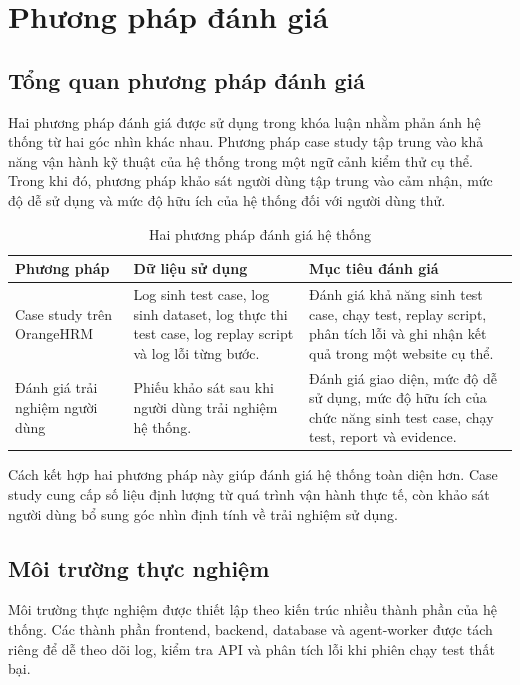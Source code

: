 \section{Phương pháp đánh giá}

\subsection{Tổng quan phương pháp đánh giá}

Hai phương pháp đánh giá được sử dụng trong khóa luận nhằm phản ánh hệ thống từ hai góc nhìn khác nhau. Phương pháp case study tập trung vào khả năng vận hành kỹ thuật của hệ thống trong một ngữ cảnh kiểm thử cụ thể. Trong khi đó, phương pháp khảo sát người dùng tập trung vào cảm nhận, mức độ dễ sử dụng và mức độ hữu ích của hệ thống đối với người dùng thử.

\begin{table}[H]
\centering
\caption{Hai phương pháp đánh giá hệ thống}
\label{tab:chapter6_evaluation_methods}
\renewcommand{\arraystretch}{1.2}
\begin{tabular}{|p{4.0cm}|p{5.2cm}|p{5.2cm}|}
\hline
\textbf{Phương pháp} & \textbf{Dữ liệu sử dụng} & \textbf{Mục tiêu đánh giá} \\
\hline
Case study trên OrangeHRM & Log sinh test case, log sinh dataset, log thực thi test case, log replay script và log lỗi từng bước. & Đánh giá khả năng sinh test case, chạy test, replay script, phân tích lỗi và ghi nhận kết quả trong một website cụ thể. \\
\hline
Đánh giá trải nghiệm người dùng & Phiếu khảo sát sau khi người dùng trải nghiệm hệ thống. & Đánh giá giao diện, mức độ dễ sử dụng, mức độ hữu ích của chức năng sinh test case, chạy test, report và evidence. \\
\hline
\end{tabular}
\end{table}

Cách kết hợp hai phương pháp này giúp đánh giá hệ thống toàn diện hơn. Case study cung cấp số liệu định lượng từ quá trình vận hành thực tế, còn khảo sát người dùng bổ sung góc nhìn định tính về trải nghiệm sử dụng.

\subsection{Môi trường thực nghiệm}

Môi trường thực nghiệm được thiết lập theo kiến trúc nhiều thành phần của hệ thống. Các thành phần frontend, backend, database và agent-worker được tách riêng để dễ theo dõi log, kiểm tra API và phân tích lỗi khi phiên chạy test thất bại.

